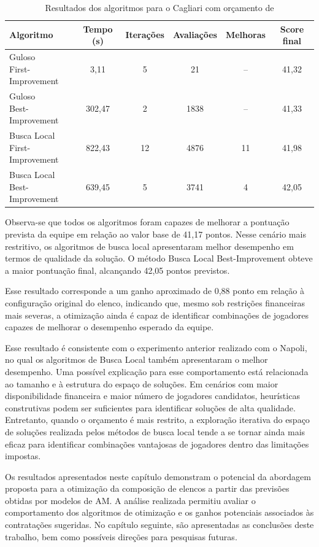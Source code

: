 \begin{table}[H]
\centering
\caption{Resultados dos algoritmos para o Cagliari com orçamento de }
\label{tab:cagliari_orcamento}
\begin{tabular}{lccccc}
\toprule
Algoritmo & Tempo (s) & Iterações & Avaliações & Melhoras & Score final \\
\midrule
\makecell[l]{Guloso \\ First-Improvement} & 3,11 & 5 & 21 & -- & 41,32 \\[4pt]
\makecell[l]{Guloso \\ Best-Improvement} & 302,47 & 2 & 1838 & -- & 41,33 \\[10pt]
\makecell[l]{Busca Local \\ First-Improvement} & 822,43 & 12 & 4876 & 11 & 41,98 \\[4pt]
\makecell[l]{Busca Local \\ Best-Improvement} & 639,45 & 5 & 3741 & 4 & 42,05 \\
\bottomrule
\end{tabular}
\end{table}

Observa-se que todos os algoritmos foram capazes de melhorar a pontuação prevista da 
equipe em relação ao valor base de 41,17 pontos. 
Nesse cenário mais restritivo, os algoritmos de busca local apresentaram melhor 
desempenho em termos de qualidade da solução. 
O método Busca Local Best-Improvement obteve a maior pontuação final, 
alcançando 42,05 pontos previstos.

Esse resultado corresponde a um ganho aproximado de 0,88 ponto em relação à 
configuração original do elenco, indicando que, mesmo sob restrições financeiras 
mais severas, a otimização ainda é capaz de identificar combinações de jogadores 
capazes de melhorar o desempenho esperado da equipe.

Esse resultado é consistente com o experimento anterior realizado com o Napoli, no 
qual os algoritmos de Busca Local também apresentaram o melhor desempenho. 
Uma possível explicação para esse comportamento está relacionada ao tamanho e à estrutura 
do espaço de soluções. Em cenários com maior disponibilidade financeira 
e maior número de jogadores candidatos, heurísticas construtivas podem ser 
suficientes para identificar soluções de alta qualidade. 
Entretanto, quando o orçamento é mais restrito, a exploração iterativa do espaço 
de soluções realizada pelos métodos de busca local tende a se tornar ainda mais eficaz 
para identificar combinações vantajosas de jogadores dentro das limitações impostas.

Os resultados apresentados neste capítulo demonstram o potencial da abordagem 
proposta para a otimização da composição de elencos a partir das previsões obtidas 
por modelos de AM. A análise realizada permitiu avaliar o comportamento dos 
algoritmos de otimização e os ganhos potenciais associados às contratações sugeridas. 
No capítulo seguinte, são apresentadas as conclusões deste trabalho, bem 
como possíveis direções para pesquisas futuras.